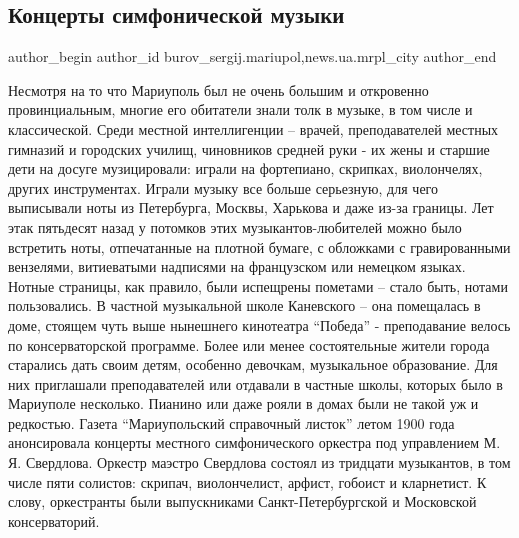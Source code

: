  
 
 
 
 
 
\subsection{Концерты симфонической музыки}
\label{sec:28_04_2018.stz.news.ua.mrpl_city.1.koncerty_simfonicheskoj_muzyki}
 
\ifcmt
 author_begin
   author_id burov_sergij.mariupol,news.ua.mrpl_city
 author_end
\fi


Несмотря на то что Мариуполь был не очень большим и откровенно провинциальным,
многие его обитатели знали толк в музыке, в том числе и классической. Среди
местной интеллигенции – врачей, преподавателей местных гимназий и городских
училищ, чиновников средней руки - их жены и старшие дети на досуге
музицировали: играли на фортепиано, скрипках, виолончелях, других инструментах.
Играли музыку все больше серьезную, для чего выписывали ноты из Петербурга,
Москвы, Харькова и даже из-за границы. Лет этак пятьдесят назад у потомков этих
музыкантов-любителей можно было встретить ноты, отпечатанные на плотной бумаге,
с обложками с гравированными вензелями, витиеватыми надписями на французском
или немецком языках. Нотные страницы, как правило, были испещрены пометами –
стало быть, нотами пользовались. В частной музыкальной школе Каневского – она
помещалась в доме, стоящем чуть выше нынешнего кинотеатра \enquote{Победа} -
преподавание велось по консерваторской программе. Более или менее состоятельные
жители города старались дать своим детям, особенно девочкам, музыкальное
образование. Для них приглашали преподавателей или отдавали в частные школы,
которых было в Мариуполе несколько. Пианино или даже рояли в домах были не
такой уж и редкостью. Газета \enquote{Мариупольский справочный листок} летом 1900 года
анонсировала концерты местного симфонического орке­стра под управлением М. Я.
Свердлова. Оркестр маэстро Свердлова состоял из тридцати музыкантов, в том
числе пяти солистов: скрипач, виолончелист, арфист, гобоист и кларнетист. К
слову, оркестранты были выпускниками Санкт-Петербургской и Московской
консерваторий. 

